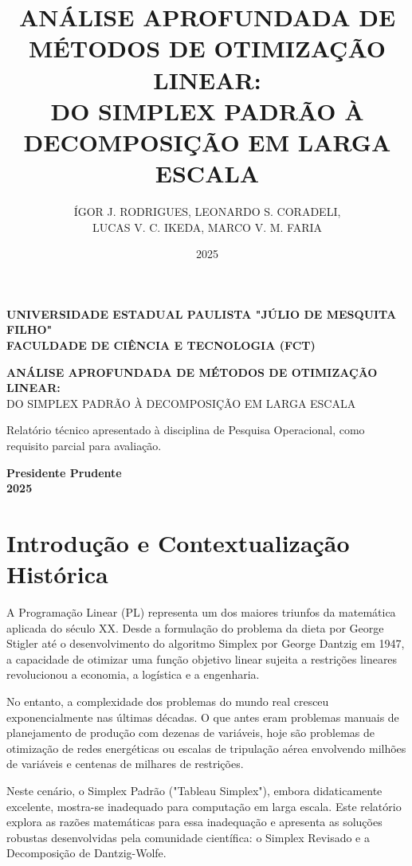 \documentclass[12pt, a4paper]{article}
\title{\textbf{ANÁLISE APROFUNDADA DE MÉTODOS DE OTIMIZAÇÃO LINEAR:}\\ \large DO SIMPLEX PADRÃO À DECOMPOSIÇÃO EM LARGA ESCALA}
\author{ÍGOR J. RODRIGUES, LEONARDO S. CORADELI, \\ LUCAS V. C. IKEDA, MARCO V. M. FARIA}
\date{2025}
\begin{document}
\begin{titlepage}
    \centering
    \textbf{\Large UNIVERSIDADE ESTADUAL PAULISTA "JÚLIO DE MESQUITA FILHO"}\\
    \textbf{\large FACULDADE DE CIÊNCIA E TECNOLOGIA (FCT)}
    
    \vspace{6cm}
    
    \textbf{\Large ANÁLISE APROFUNDADA DE MÉTODOS DE OTIMIZAÇÃO LINEAR:}\\
    \vspace{0.5cm}
    \large DO SIMPLEX PADRÃO À DECOMPOSIÇÃO EM LARGA ESCALA
    
    \vspace{5cm}
    
    \begin{flushright}
        \begin{minipage}{0.5\textwidth}
            Relatório técnico apresentado à disciplina de Pesquisa Operacional, como requisito parcial para avaliação.
        \end{minipage}
    \end{flushright}
    
    \vfill
    \textbf{Presidente Prudente}\\
    \textbf{2025}
\end{titlepage}

\tableofcontents
\newpage


\section{Introdução e Contextualização Histórica}
A Programação Linear (PL) representa um dos maiores triunfos da matemática aplicada do século XX. Desde a formulação do problema da dieta por George Stigler até o desenvolvimento do algoritmo Simplex por George Dantzig em 1947, a capacidade de otimizar uma função objetivo linear sujeita a restrições lineares revolucionou a economia, a logística e a engenharia.

No entanto, a complexidade dos problemas do mundo real cresceu exponencialmente nas últimas décadas. O que antes eram problemas manuais de planejamento de produção com dezenas de variáveis, hoje são problemas de otimização de redes energéticas ou escalas de tripulação aérea envolvendo milhões de variáveis e centenas de milhares de restrições.

Neste cenário, o Simplex Padrão ("Tableau Simplex"), embora didaticamente excelente, mostra-se inadequado para computação em larga escala. Este relatório explora as razões matemáticas para essa inadequação e apresenta as soluções robustas desenvolvidas pela comunidade científica: o Simplex Revisado e a Decomposição de Dantzig-Wolfe.
\end{document}
